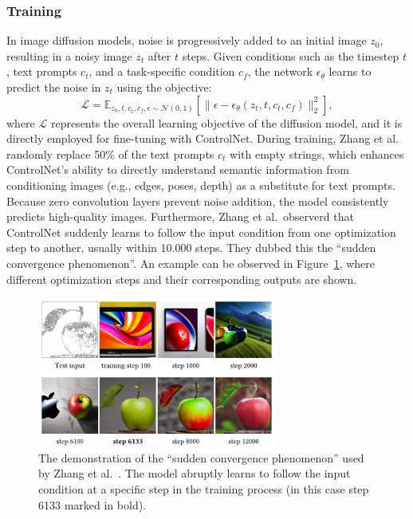 \subsubsection{Training}
In image diffusion models, noise is progressively added to an initial image $z_0$, resulting in a noisy image $z_t$ after $t$ steps. Given conditions such as the timestep $t$, text prompts $c_t$, and a task-specific condition $c_f$, the network $\epsilon_\theta$ learns to predict the noise in $z_t$ using the objective:
\[
\mathcal{L} = \mathbb{E}_{z_0, t, c_t, c_f, \epsilon \sim \mathcal{N}(0, 1)} \left[ \| \epsilon - \epsilon_\theta(z_t, t, c_t, c_f) \|_2^2 \right],
\]
where $\mathcal{L}$ represents the overall learning objective of the diffusion model, and it is directly employed for fine-tuning with ControlNet. During training, Zhang et al.~\cite{zhang2023addingconditionalcontroltexttoimage} randomly replace 50\% of the text prompts $c_t$ with empty strings, which enhances ControlNet's ability to directly understand semantic information from conditioning images (e.g., edges, poses, depth) as a substitute for text prompts. Because zero convolution layers prevent noise addition, the model consistently predicts high-quality images. Furthermore, Zhang et al.\ observerd that ControlNet suddenly learns to follow the input condition from one optimization step to another, usually within 10.000 steps. They dubbed this the ``sudden convergence phenomenon''. An example can be observed in Figure~\ref{fig:control_net:training_steps}, where different optimization steps and their corresponding outputs are shown.
\begin{figure}[h!]
    \centering
    \includegraphics[width=0.7\textwidth]{assets/control_net_training_steps.pdf}
    \caption{The demonstration of the ``sudden convergence phenomenon'' used by Zhang et al.~\cite{zhang2023addingconditionalcontroltexttoimage}. The model abruptly learns to follow the input condition at a specific step in the training process (in this case step 6133 marked in bold).}
    \label{fig:control_net:training_steps}
\end{figure}
